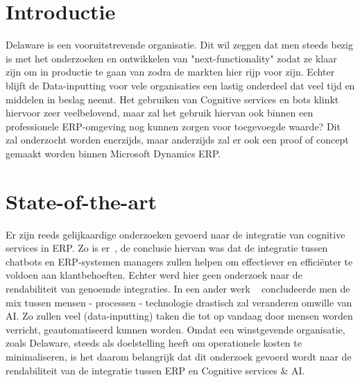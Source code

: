 
\section{Introductie} %
\label{sec:introductie}
Delaware is een vooruitstrevende organisatie. Dit wil zeggen dat men steeds bezig is met het onderzoeken en ontwikkelen van "next-functionality"  zodat ze klaar zijn om in productie te gaan van zodra de markten hier rijp voor zijn. Echter blijft de Data-inputting voor vele organisaties een lastig onderdeel dat veel tijd en middelen in beslag neemt. Het gebruiken van Cognitive services en bots klinkt hiervoor zeer veelbelovend, maar zal het gebruik hiervan ook binnen een professionele ERP-omgeving nog kunnen zorgen voor toegevoegde waarde? Dit zal onderzocht worden enerzijds, maar anderzijds zal er ook een proof of concept gemaakt worden binnen Microsoft Dynamics ERP. 



\section{State-of-the-art}
\label{sec:state-of-the-art}
Er zijn reeds gelijkaardige onderzoeken gevoerd naar de integratie van cognitive services in ERP. Zo is er~\autocite{RizkyDharana2017}, de conclusie hiervan was dat de integratie tussen chatbots en ERP-systemen managers zullen helpen om effectiever en efficiënter te voldoen aan klantbehoeften. Echter werd hier geen onderzoek naar de rendabiliteit van genoemde integraties. In een ander werk ~\autocite{Baat2016} concludeerde men de mix tussen mensen - processen - technologie drastisch zal veranderen omwille van AI. Zo zullen veel (data-inputting) taken die tot op vandaag door mensen worden verricht, geautomatiseerd kunnen worden. Omdat een winstgevende organisatie, zoals Delaware, steeds als doelstelling heeft om operationele kosten te minimaliseren, is het daarom belangrijk dat dit onderzoek gevoerd wordt naar de rendabiliteit van de integratie tussen ERP en Cognitive services \& AI. 
